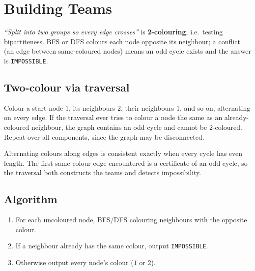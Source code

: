 \section{Building Teams}
\label{sec:cses-building-teams}


\begin{patternbox}
\emph{``Split into two groups so every edge crosses''} is
\textbf{2-colouring}, i.e.\ testing bipartiteness. BFS or DFS colours each
node opposite its neighbour; a conflict (an edge between same-coloured
nodes) means an odd cycle exists and the answer is \texttt{IMPOSSIBLE}.
\end{patternbox}

\subsection*{Two-colour via traversal}

Colour a start node $1$, its neighbours $2$, their neighbours $1$, and so
on, alternating on every edge. If the traversal ever tries to colour a node
the same as an already-coloured neighbour, the graph contains an odd cycle
and cannot be 2-coloured. Repeat over all components, since the graph may
be disconnected.

\begin{ideabox}
Alternating colours along edges is consistent exactly when every cycle has
even length. The first same-colour edge encountered is a certificate of an
odd cycle, so the traversal both constructs the teams and detects
impossibility.
\end{ideabox}

\subsection*{Algorithm}

\begin{enumerate}
  \item For each uncoloured node, BFS/DFS colouring neighbours with the
        opposite colour.
  \item If a neighbour already has the same colour, output
        \texttt{IMPOSSIBLE}.
  \item Otherwise output every node's colour ($1$ or $2$).
\end{enumerate}

